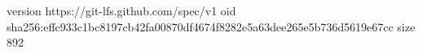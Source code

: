version https://git-lfs.github.com/spec/v1
oid sha256:effc933c1bc8197cb42fa00870df4674f8282e5a63dee265e5b736d5619e67cc
size 892
